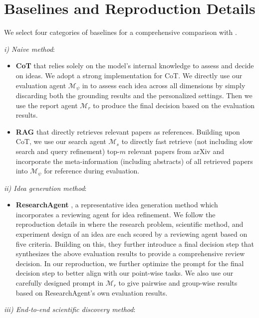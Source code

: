 \section{Baselines and Reproduction Details}
\label{app:baselines}
We select four categories of baselines for a comprehensive comparison with \textbf{\ours}.

\textit{i) Naive method}:
\begin{itemize}[topsep=0pt,partopsep=0pt,parsep=0pt,itemsep=0pt,leftmargin=*,labelsep=0.5em]
    \item \textbf{CoT} that relies solely on the model’s internal knowledge to assess and decide on ideas. We adopt a strong implementation for CoT. We directly use our evaluation agent $\boldsymbol{\mathcal{M}}_{\psi}$ in {\ours} to assess each idea across all dimensions by simply discarding both the grounding results and the personalized settings. Then we use the report agent $\boldsymbol{\mathcal{M}}_r$ to produce the final decision based on the evaluation results.
    \item \textbf{RAG} that directly retrieves relevant papers as references. Building upon CoT, we use our search agent $\boldsymbol{\mathcal{M}}_s$ to directly fast retrieve (not including slow search and query refinement) top-$m$ relevant papers from arXiv and incorporate the meta-information (including abstracts) of all retrieved papers into $\boldsymbol{\mathcal{M}}_{\psi}$ for reference during evaluation.
\end{itemize}
\textit{ii) Idea generation method}:
\begin{itemize}[topsep=0pt,partopsep=0pt,parsep=0pt,itemsep=0pt,leftmargin=*,labelsep=0.5em]
    \item \textbf{ResearchAgent} \cite{researchagent}, a representative idea generation method which incorporates a reviewing agent for idea refinement. We follow the reproduction details in \citet{grapheval} where the research problem, scientific method, and experiment design of an idea are each scored by a reviewing agent based on five criteria. Building on this, they further introduce a final decision step that synthesizes the above evaluation results to provide a comprehensive review decision. In our reproduction, we further optimize the prompt for the final decision step to better align with our point-wise tasks. We also use our carefully designed prompt in $\boldsymbol{\mathcal{M}}_r$ to give pairwise and group-wise results based on ResearchAgent's own evaluation results.
\end{itemize}
\textit{iii) End-to-end scientific discovery method}:
